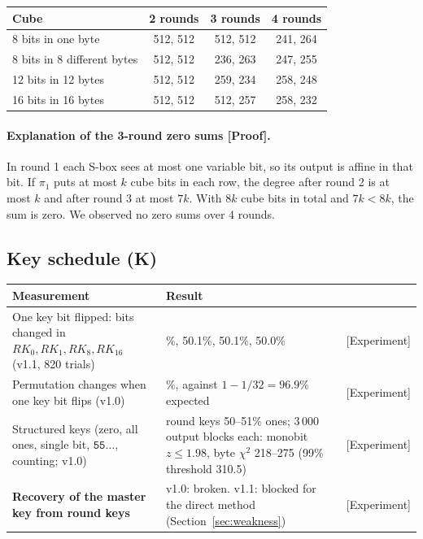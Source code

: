 \documentclass[11pt,a4paper]{article}
\newcommand{\ev}[1]{\textup{\textsf{[#1]}}}
\newcommand{\RK}{\mathit{RK}}
\newcommand{\hx}[1]{\mathtt{#1}}
\begin{document}
\begin{center}\small
\begin{tabular}{@{}lccc@{}}
\toprule
Cube & 2 rounds & 3 rounds & 4 rounds\\
\midrule
8 bits in one byte & 512, 512 & 512, 512 & 241, 264\\
8 bits in 8 different bytes & 512, 512 & 236, 263 & 247, 255\\
12 bits in 12 bytes & 512, 512 & 259, 234 & 258, 248\\
16 bits in 16 bytes & 512, 512 & 512, 257 & 258, 232\\
\bottomrule
\end{tabular}
\end{center}

\paragraph{Explanation of the 3-round zero sums \ev{Proof}.} In round 1 each S-box sees at most one variable bit,
so its output is affine in that bit. If $\pi_1$ puts at most $k$ cube bits in each row, the degree after round 2
is at most $k$ and after round 3 at most $7k$. With $8k$ cube bits in total and $7k < 8k$, the sum is zero. We
observed no zero sums over 4 rounds.

\subsection{Key schedule (K)}

\begin{center}\small
\begin{tabularx}{\textwidth}{@{}>{\raggedright\arraybackslash}X>{\raggedright\arraybackslash}Xl@{}}
\toprule
Measurement & Result & \\
\midrule
One key bit flipped: bits changed in $\RK_0, \RK_1, \RK_8, \RK_{16}$ (v1.1, 820 trials) & 50.1\%, 50.1\%,
  50.1\%, 50.0\% & \ev{Experiment}\\
Permutation changes when one key bit flips (v1.0) & 97.0\%, against $1 - 1/32 = 96.9\%$ expected &
  \ev{Experiment}\\
Structured keys (zero, all ones, single bit, $\hx{55}\ldots$, counting; v1.0) & round keys 50--51\% ones; 3\,000
  output blocks each: monobit $z \le 1.98$, byte $\chi^2$ 218--275 (99\% threshold 310.5) & \ev{Experiment}\\
\textbf{Recovery of the master key from round keys} & v1.0: broken. v1.1: blocked for the direct method
  (Section~\ref{sec:weakness}) & \ev{Experiment}\\
\bottomrule
\end{tabularx}
\end{center}
\end{document}
